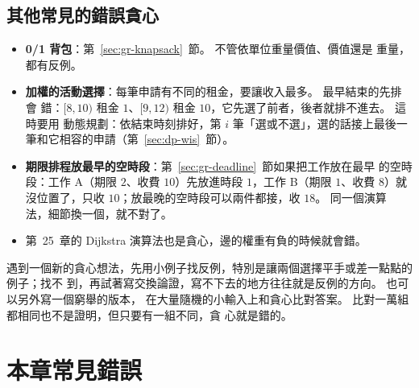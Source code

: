 \subsection{其他常見的錯誤貪心}

\begin{itemize}
\item \textbf{0/1 背包}：第~\ref{sec:gr-knapsack}~節。 不管依單位重量價值、價值還是
重量，都有反例。
\item \textbf{加權的活動選擇}：每筆申請有不同的租金，要讓收入最多。 最早結束的先排會
錯：$[8, 10)$ 租金 $1$、$[9, 12)$ 租金 $10$，它先選了前者，後者就排不進去。 這時要用
動態規劃：依結束時刻排好，第 $i$ 筆「選或不選」，選的話接上最後一筆和它相容的申請（第~\ref{sec:dp-wis}~節）。
\item \textbf{期限排程放最早的空時段}：第~\ref{sec:gr-deadline}~節如果把工作放在最早
的空時段：工作 A（期限 $2$、收費 $10$）先放進時段 $1$，工作 B（期限 $1$、收費 $8$）就
沒位置了，只收 $10$；放最晚的空時段可以兩件都接，收 $18$。 同一個演算
法，細節換一個，就不對了。
\item 第~25~章的 Dijkstra 演算法也是貪心，邊的權重有負的時候就會錯。
\end{itemize}

遇到一個新的貪心想法，先用小例子找反例，特別是讓兩個選擇平手或差一點點的例子；找不
到，再試著寫交換論證，寫不下去的地方往往就是反例的方向。 也可以另外寫一個窮舉的版本，
在大量隨機的小輸入上和貪心比對答案。 比對一萬組都相同也不是證明，但只要有一組不同，貪
心就是錯的。

\section{本章常見錯誤}
\label{sec:gr-pitfalls}

